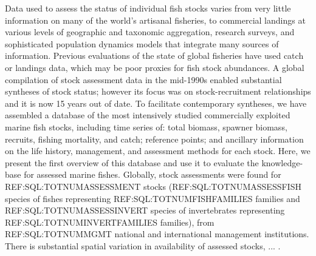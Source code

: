 
Data used to assess the status of individual fish stocks varies from
very little information on many of the world's artisanal fisheries, to
commercial landings at various levels of geographic and taxonomic
aggregation, research surveys, and sophisticated population dynamics
models that integrate many sources of information.  Previous
evaluations of the state of global fisheries have used catch or
landings data, which may be poor proxies for fish stock abundances. A
global compilation of stock assessment data in the mid-1990s enabled
substantial syntheses of stock status; however its focus was on
stock-recruitment relationships and it is now 15 years out of date. To
facilitate contemporary syntheses, we have assembled a database of the
most intensively studied commercially exploited marine fish stocks,
including time series of: total biomass, spawner biomass, recruits,
fishing mortality, and catch; reference points; and ancillary
information on the life history, management, and assessment methods
for each stock.  Here, we present the first overview of this database
and use it to evaluate the knowledge-base for assessed marine fishes.
Globally, stock assessments were found for REF:SQL:TOTNUMASSESSMENT
stocks (REF:SQL:TOTNUMASSESSFISH species of fishes representing
REF:SQL:TOTNUMFISHFAMILIES families and REF:SQL:TOTNUMASSESSINVERT
species of invertebrates representing REF:SQL:TOTNUMINVERTFAMILIES
families), from REF:SQL:TOTNUMMGMT national and international
management institutions. There is substantial spatial variation in availability of assessed
stocks, ... .\\

